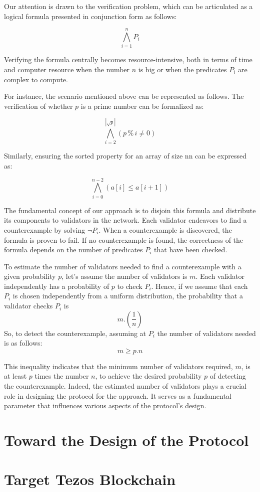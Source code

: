 \documentclass[runningheads]{llncs}
\begin{document}
Our attention is drawn to the verification problem, which can be articulated as a logical formula presented in conjunction form as follows:

\[ \bigwedge_{i = 1}^{n} P_{i} \]

Verifying the formula centrally becomes resource-intensive, both in terms of time and computer resource when the number $n$ is big or when the predicates $P_{i}$ are complex to compute. 


For instance, the scenario mentioned above can be represented as follows. The verification of whether $p$ is a prime number can be formalized as:

\[ \bigwedge_{i = 2}^{|\sqrt p|} (p \mathbin{\%} i \neq 0) \]

Similarly, ensuring the sorted property for an array of size nn can be expressed as:

\[ \bigwedge_{i = 0}^{n - 2} (a[i] \le a[i+1]) \]

The fundamental concept of our approach is to disjoin this formula and distribute its components to validators in the network. Each validator endeavors to find a counterexample by solving $\neg P_{i}$. When a counterexample is discovered, the formula is proven to fail. If no counterexample is found, the correctness of the formula depends on the number of predicates  $P_{i}$ that have been checked. 


To estimate the number of validators needed to find a counterexample with a given probability $p$, let's assume the number of validators is $m$. Each validator independently has a probability of $p$ to check $P_{i}$. Hence, if we assume that each $P_{i}$ is chosen independently from a uniform distribution, the probability that a validator checks $P_{i}$ is 
\begin{displaymath}
 m. (\frac{1}{n})
\end{displaymath}
So, to detect the counterexample, assuming at $P_{i}$ the number of validators needed is as follows:
\begin{displaymath}
 m \ge p.n
\end{displaymath}

This inequality indicates that the minimum number of validators required, $m$, is at least $p$ times the number $n$, to achieve the desired probability $p$ of detecting the counterexample. Indeed, the estimated number of validators plays a crucial role in designing the protocol for the approach. It serves as a fundamental parameter that influences various aspects of the protocol's design.
\section{Toward the Design of the Protocol}
\label{sec:design}


\section{Target Tezos Blockchain}
\label{sec:tezos}
\end{document}
